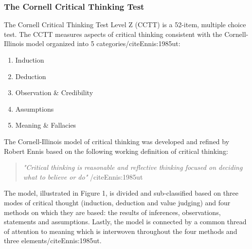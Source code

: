 \subsubsection{The Cornell Critical Thinking Test}

The Cornell Critical Thinking Test Level Z (CCTT) is a 52-item, multiple choice test. The CCTT measures aspects of critical thinking consistent with the Cornell-Illinois model organized into 5 categories/cite{Ennis:1985ut}:

\begin{enumerate}
\item Induction
\item Deduction
\item Observation & Credibility
\item Assumptions
\item Meaning & Fallacies
\end{enumerate}

The Cornell-Illinois model of critical thinking was developed and refined by Robert Ennis based on the following working definition of critical thinking:

\begin{quote}
\textit{"Critical thinking is reasonable and reflective thinking focused on deciding what to believe or do"} /cite{Ennis:1985ut}
\end{quote}

The model, illustrated in Figure 1, is divided and sub-classified based on three modes of critical thought (induction, deduction and value judging) and four methods on which they are based: the results of inferences, observations, statements and assumptions. Lastly, the model is connected by a common thread of attention to meaning which is interwoven throughout the four methods and three elements/cite{Ennis:1985ut}. 

